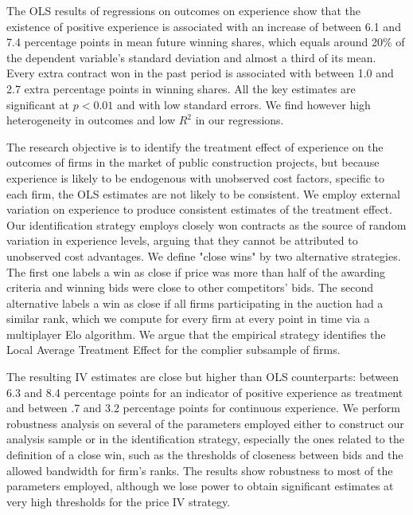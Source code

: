 
The OLS results of regressions on outcomes on experience show that the existence of positive experience is associated with an increase of between 6.1 and 7.4 percentage points in mean future winning shares, which equals around 20\% of the dependent variable's standard deviation and almost a third of its mean. Every extra contract won in the past period is associated with between 1.0 and 2.7 extra percentage points in winning shares. All the key estimates are significant at $p<0.01$ and with low standard errors. We find however high heterogeneity in outcomes and low $R^2$ in our regressions.

The research objective is to identify the treatment effect of experience on the outcomes of firms in the market of public construction projects, but because experience is likely to be endogenous with unobserved cost factors, specific to each firm, the OLS estimates are not likely to be consistent. We employ external variation on experience to produce consistent estimates of the treatment effect. Our identification strategy employs closely won contracts as the source of random variation in experience levels, arguing that they cannot be attributed to unobserved cost advantages. We define "close wins" by two alternative strategies. The first one labels a win as close if price was more than half of the awarding criteria and winning bids were close to other competitors' bids. The second alternative labels a win as close if all firms participating in the auction had a similar rank, which we compute for every firm at every point in time via a multiplayer Elo algorithm. We argue that the empirical strategy identifies the Local Average Treatment Effect for the complier subsample of firms.

The resulting IV estimates are close but higher than OLS counterparts: between 6.3 and 8.4 percentage points for an indicator of positive experience as treatment and between .7 and 3.2 percentage points for continuous experience. We perform robustness analysis on several of the parameters employed either to construct our analysis sample or in the identification strategy, especially the ones related to the definition of a close win, such as the thresholds of closeness between bids and the allowed bandwidth for firm's ranks. The results show robustness to most of the parameters employed, although we lose power to obtain significant estimates at very high thresholds for the price IV strategy.

